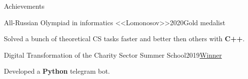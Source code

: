 \documentclass{resume} %
\begin{document}
\begin{rSection}{Achievements}
    \begin{rSubsection}
        {All-Russian Olympiad in informatics <<Lomonosov>>}{2020}{Gold medalist}{}
        \item Solved a bunch of theoretical CS tasks faster and better then others with \textbf{C++}.
    \end{rSubsection}

    \begin{rSubsection}
        {Digital Transformation of the Charity Sector Summer School}{2019}{\href{https://www.hse.ru/en/news/298686356.html}{Winner}}{}
    \item Developed a \textbf{Python} telegram bot.
    \end{rSubsection}
\end{rSection}






\end{document}
